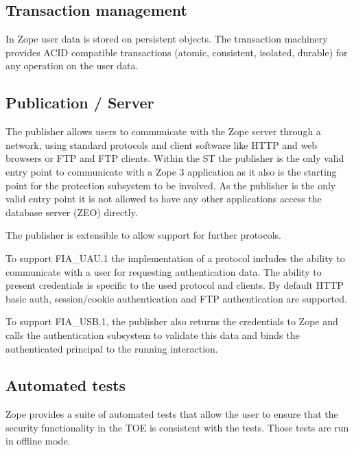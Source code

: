 \documentclass[12pt,english]{scrbook}
\begin{document}
\subsection{Transaction management}

In Zope user data is stored on persistent objects. The transaction machinery
provides ACID compatible transactions (atomic, consistent, isolated, durable)
for any operation on the user data.


\subsection{Publication / Server}

The publisher allows users to communicate with the Zope server through a
network, using standard protocols and client software like HTTP and web
browsers or FTP and FTP clients. Within the ST the publisher is the only valid
entry point to communicate with a Zope 3 application as it also is the
starting point for the protection subsystem to be involved. As the publisher
is the only valid entry point it is not allowed to have any other applications
access the database server (ZEO) directly.

The publisher is extensible to allow support for further protocols.

To support FIA{\_}UAU.1 the implementation of a protocol includes the ability
to communicate with a user for requesting authentication data. The ability to
present credentials is specific to the used protocol and clients. By default
HTTP basic auth, session/cookie authentication and FTP authentication are
supported.

To support FIA{\_}USB.1, the publisher also returns the credentials to Zope and
calls the authentication subsystem to validate this data and binds the
authenticated principal to the running interaction.



\subsection{Automated tests}

Zope provides a suite of automated tests that allow the user to ensure that the
security functionality in the TOE is consistent with the tests. Those tests are
run in offline mode.
\end{document}

